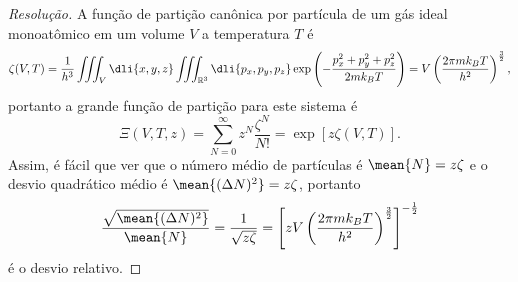 \begin{proof}[Resolução]
    A função de partição canônica por partícula de um gás ideal monoatômico em um volume \(V\) a temperatura \(T\) é
    \begin{equation*}
        \zeta(V, T) = \frac{1}{h^3} \iiint_{V} \dli{x,y,z}\iiint_{\mathbb{R}^3} \dli{p_x,p_y,p_z} \exp{\left(-\frac{p_x^2 + p_y^2 + p_z^2}{2mk_B T}\right)} = V\left(\frac{2\pi m k_BT}{h^2}\right)^{\frac32},
    \end{equation*}
    portanto a grande função de partição para este sistema é
    \begin{equation*}
        \Xi(V, T, z) = \sum_{N = 0}^\infty z^N \frac{\zeta^N}{N!} = \exp[z \zeta(V, T)].
    \end{equation*}
    Assim, é fácil que ver que o número médio de partículas é \(\mean{N} = z \zeta\) e o desvio quadrático médio é \(\mean{(\Delta N)^2} = z \zeta\), portanto
    \begin{equation*}
        \frac{\sqrt{\mean{(\Delta N)^2}}}{\mean{N}} = \frac{1}{\sqrt{z \zeta}} = \left[zV\left(\frac{2\pi m k_B T}{h^2}\right)^{\frac32}\right]^{-\frac12}
    \end{equation*}
    é o desvio relativo.
\end{proof}
